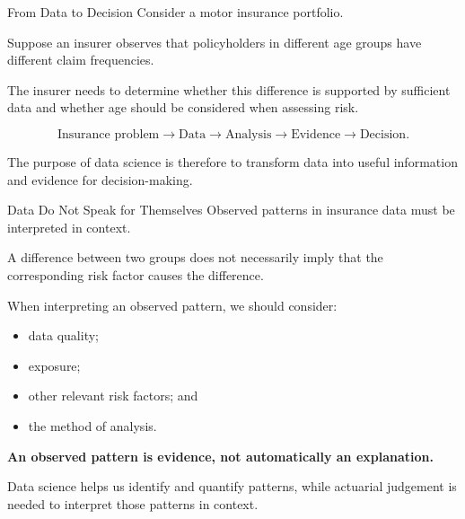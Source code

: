 \documentclass[
  ignorenonframetext,
  aspectratio=169,
]{beamer}
\providecommand{\tightlist}{%
  \setlength{\itemsep}{0pt}\setlength{\parskip}{0pt}}
\begin{document}
\begin{frame}{From Data to Decision}
\protect{}\label{from-data-to-decision}
Consider a motor insurance portfolio.

Suppose an insurer observes that policyholders in different age groups
have different claim frequencies.

The insurer needs to determine whether this difference is supported by
sufficient data and whether age should be considered when assessing
risk.

\[
\text{Insurance problem}
\rightarrow
\text{Data}
\rightarrow
\text{Analysis}
\rightarrow
\text{Evidence}
\rightarrow
\text{Decision}.
\]

The purpose of data science is therefore to transform data into useful
information and evidence for decision-making.
\end{frame}

\begin{frame}{Data Do Not Speak for Themselves}
\protect{}\label{data-do-not-speak-for-themselves}
Observed patterns in insurance data must be interpreted in context.

A difference between two groups does not necessarily imply that the
corresponding risk factor causes the difference.

When interpreting an observed pattern, we should consider:

\begin{itemize}
\tightlist
\item
  data quality;
\item
  exposure;
\item
  other relevant risk factors; and
\item
  the method of analysis.
\end{itemize}

\begin{tcolorbox}[enhanced jigsaw, arc=.35mm, bottomrule=.15mm, bottomtitle=1mm, breakable, colback=white, colbacktitle=quarto-callout-note-color!10!white, colframe=quarto-callout-note-color-frame, coltitle=black, left=2mm, leftrule=.75mm, opacityback=0, opacitybacktitle=0.6, rightrule=.15mm, title=\textcolor{quarto-callout-note-color}{\faInfo}\hspace{0.5em}{Key idea}, titlerule=0mm, toprule=.15mm, toptitle=1mm]

\textbf{An observed pattern is evidence, not automatically an
explanation.}

Data science helps us identify and quantify patterns, while actuarial
judgement is needed to interpret those patterns in context.

\end{tcolorbox}
\end{frame}
\end{document}
